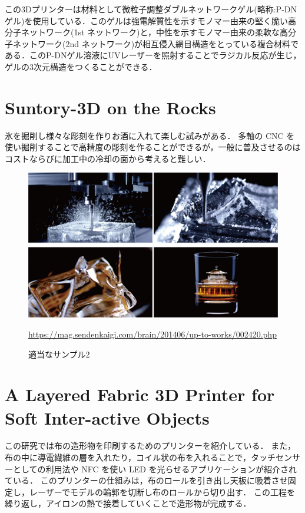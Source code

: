 この3Dプリンターは材料として微粒子調整ダブルネットワークゲル(略称:P-DNゲル)を使用している．このゲルは強電解質性を示すモノマー由来の堅く脆い高分子ネットワーク(1st ネットワーク)と，中性を示すモノマー由来の柔軟な高分子ネットワーク(2nd ネットワーク)が相互侵入網目構造をとっている複合材料である．このP-DNゲル溶液にUVレーザーを照射することでラジカル反応が生じ，ゲルの3次元構造をつくることができる．


\section{Suntory-3D on the Rocks\cite{b}}
\label{sec:enum}

氷を掘削し様々な彫刻を作りお酒に入れて楽しむ試みがある．
多軸の CNC を使い掘削することで高精度の彫刻を作ることができるが，一般に普及させるのはコストならびに加工中の冷却の面から考えると難しい．

\begin{figure}[H]
  \centering
  \includegraphics[width=12truecm]{./fig/Suntory.jpg}
  \caption{適当なサンプル2}
  \url{https://mag.sendenkaigi.com/brain/201406/up-to-works/002420.php} %
  \label{fig:Suntory}
\end{figure}


\section{A Layered Fabric 3D Printer for Soft Inter-active Objects\cite{c}}
\label{sec:enum}
この研究では布の造形物を印刷するためのプリンターを紹介している．
また，布の中に導電繊維の層を入れたり，コイル状の布を入れることで，タッチセンサーとしての利用法や NFC を使い LED を光らせるアプリケーションが紹介されている．
このプリンターの仕組みは，布のロールを引き出し天板に吸着させ固定し，レーザーでモデルの輪郭を切断し布のロールから切り出す．
この工程を繰り返し，アイロンの熱で接着していくことで造形物が完成する．

